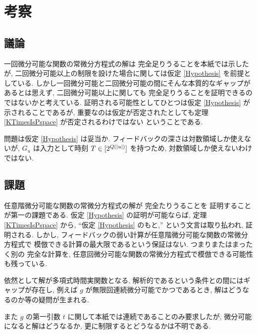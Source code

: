 \section{考察}


\subsection{議論}
一回微分可能な関数の常微分方程式の解は \PSPACE 完全足りうることを本紙では示したが,
二回微分可能以上の制限を設けた場合に関しては仮定 \ref{Hypothesis} を前提としている.
しかし一回微分可能と二回微分可能の間にそんな本質的なギャップがあるとは思えず,
二回微分可能以上に関しても \PSPACE 完全足りうることを証明できるのではないかと考えている.
証明される可能性としてひとつは仮定 \ref{Hypothesis} が示されることであるが,
重要なのは仮定が否定されたとしても定理 \ref{KTimesIsPspace} が否定されるわけではない
ということである.

問題は仮定 \ref{Hypothesis} は妥当か.
フィードバックの深さは対数領域しか使えないが, $G_u$ は入力として時刻 $T \in [2^{Q(|u|)}]$
を持つため, 対数領域しか使えないわけではない.


\subsection{課題}


任意階微分可能な関数の常微分方程式の解が \PSPACE 完全たりうることを
証明することが第一の課題である.
仮定 \ref{Hypothesis} の証明が可能ならば, 定理 \ref{KTimesIsPspace} から,
``仮定 \ref{Hypothesis} のもと,'' という文言は取り払われ, 証明される.
しかし, フィードバックの弱い計算が任意階微分可能な関数の常微分方程式で
模倣できる計算の最大限であるという保証はない.
つまりまたはまったく別の \PSPACE 完全な計算を,
任意回微分可能な関数の常微分方程式で模倣できる可能性も残っている.

依然として解が多項式時間実関数となる, 解析的であるという条件との間にはギャップが存在し,
例えば $g$ が無限回連続微分可能でかつであるとき, 解はどうなるのか等の疑問が生まれる.

また $g$ の第一引数 $t$ に関して本紙では連続であることのみ要求したが,
微分可能になると解はどうなるか, 更に制限するとどうなるかは不明である.




